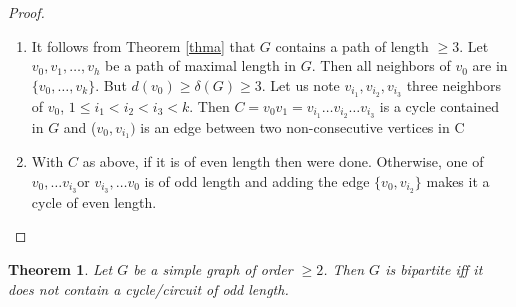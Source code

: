 \documentclass[12pt,a4paper]{article}
\newtheorem{thm}{Theorem}[section]
\theoremstyle{definition}
\begin{document}
\newpage
\begin{proof} \
\begin{enumerate}
\item It follows from Theorem \ref{thma} that $G$ contains a path of length $\geq 3$. Let $v_0, v_1, \dots , v_h$ be a path of maximal length in $G$. Then all neighbors of $v_0$ are in $\{v_0, \dots ,v_k\}$. But $d(v_0) \geq  \delta(G)\geq 3.$ Let us note $v_{i_1}, v_{i_2}, v_{i_3}$ three neighbors of $v_0$,   $1\leq i_1 < i_2 <i_3<k$. Then $C= v_0v_1=v_{i_1}\dots v_{i_2} \dots v_{i_3}$ is a cycle contained in $G$ and ($v_0, v_{i_1})$ is an edge between two non-consecutive vertices in C
\item With $C$ as above, if it is of even length then were done. Otherwise, one of $v_0, \dots v_{i_3} $or $v_{i_3}, \dots v_0$ is of odd length and adding the edge $\{v_0,v_{i_2}\}$ makes it a cycle of even length.
\end{enumerate}
\end{proof}
\begin{thm}\label{thmd} Let $G$ be a simple graph of order  $\geq 2$. Then $G$ is bipartite iff it does not contain a cycle/circuit of odd length. 
\end{thm}
\end{document}
